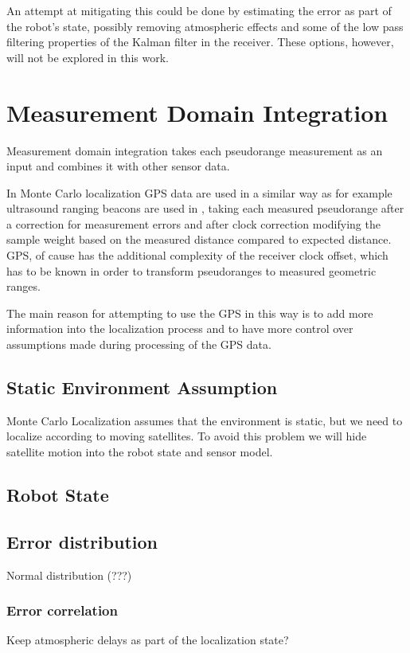 An attempt at mitigating this could be done by estimating the error as part of
the robot's state, possibly removing atmospheric effects and some of the low pass
filtering properties of the Kalman filter in the receiver.
These options, however, will not be explored in this work.

\section{Measurement Domain Integration}
\label{sec:measurement-domain}

Measurement domain integration takes each pseudorange measurement as an input
and combines it with other sensor data.

In Monte Carlo localization GPS data are used in a similar way as
for example ultrasound ranging beacons are used in \cite{some-beacon-ref},
taking each measured pseudorange after a correction for measurement errors
and after clock correction modifying the sample weight based on the measured distance
compared to expected distance.
GPS, of cause has the additional complexity of the receiver clock offset, which
has to be known in order to transform pseudoranges to measured geometric ranges.

The main reason for attempting to use the GPS in this way is to add more information
into the localization process and to have more control over assumptions made during
processing of the GPS data.

\subsection{Static Environment Assumption}
\label{sec:gps-mcl-static-env}
Monte Carlo Localization assumes that the environment is static, but we need to
localize according to moving satellites.
To avoid this problem we will hide satellite motion into the robot state and sensor model.

\subsection{Robot State}


\subsection{Error distribution}
Normal distribution (???)

\subsubsection{Error correlation}
\label{sec:measurement-domain-correlation}
Keep atmospheric delays as part of the localization state?

